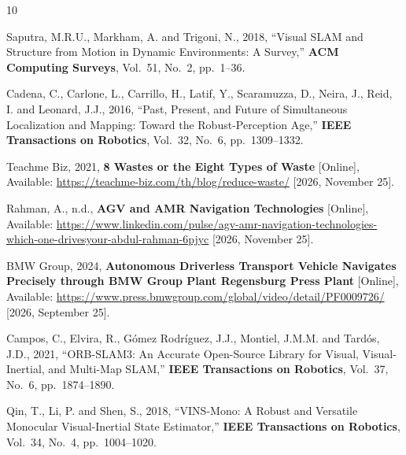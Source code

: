 \begin{thebibliography}{10}
\setlength{\itemsep}{4pt}
\raggedright{}

Saputra, M.R.U., Markham, A. and Trigoni, N., 2018, ``Visual SLAM and Structure
from Motion in Dynamic Environments: A Survey,'' \textbf{ACM Computing Surveys},
Vol.~51, No.~2, pp.~1--36.

Cadena, C., Carlone, L., Carrillo, H., Latif, Y., Scaramuzza, D., Neira, J.,
Reid, I. and Leonard, J.J., 2016, ``Past, Present, and Future of Simultaneous
Localization and Mapping: Toward the Robust-Perception Age,'' \textbf{IEEE
Transactions on Robotics}, Vol.~32, No.~6, pp.~1309--1332.

Teachme Biz, 2021, \textbf{8 Wastes or the Eight Types of Waste} [Online],
Available: \url{https://teachme-biz.com/th/blog/reduce-waste/}
[2026, November 25].

Rahman, A., n.d., \textbf{AGV and AMR Navigation Technologies} [Online],
Available:
\url{https://www.linkedin.com/pulse/agv-amr-navigation-technologies-which-one-drivesyour-abdul-rahman-6pjyc}
[2026, November 25].

BMW Group, 2024, \textbf{Autonomous Driverless Transport Vehicle Navigates
Precisely through BMW Group Plant Regensburg Press Plant} [Online], Available:
\url{https://www.press.bmwgroup.com/global/video/detail/PF0009726/}
[2026, September 25].

Campos, C., Elvira, R., G\'omez Rodr\'iguez, J.J., Montiel, J.M.M. and
Tard\'os, J.D., 2021, ``ORB-SLAM3: An Accurate Open-Source Library for Visual,
Visual-Inertial, and Multi-Map SLAM,'' \textbf{IEEE Transactions on Robotics},
Vol.~37, No.~6, pp.~1874--1890.

Qin, T., Li, P. and Shen, S., 2018, ``VINS-Mono: A Robust and Versatile
Monocular Visual-Inertial State Estimator,'' \textbf{IEEE Transactions on
Robotics}, Vol.~34, No.~4, pp.~1004--1020.


\end{thebibliography}

